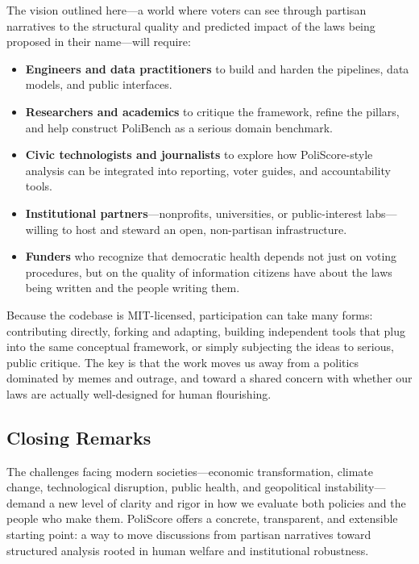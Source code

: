 \documentclass[12pt]{article}
\begin{document}
The vision outlined here---a world where voters can see through partisan narratives to the structural quality and
predicted impact of the laws being proposed in their name---will require:

\begin{itemize}
    \item \textbf{Engineers and data practitioners} to build and harden the pipelines, data models, and public interfaces.
    \item \textbf{Researchers and academics} to critique the framework, refine the pillars, and help construct PoliBench as
    a serious domain benchmark.
    \item \textbf{Civic technologists and journalists} to explore how PoliScore-style analysis can be integrated into
    reporting, voter guides, and accountability tools.
    \item \textbf{Institutional partners}---nonprofits, universities, or public-interest labs---willing to host and
    steward an open, non-partisan infrastructure.
    \item \textbf{Funders} who recognize that democratic health depends not just on voting procedures, but on the quality
    of information citizens have about the laws being written and the people writing them.
\end{itemize}

Because the codebase is MIT-licensed, participation can take many forms: contributing directly, forking and adapting,
building independent tools that plug into the same conceptual framework, or simply subjecting the ideas to serious,
public critique. The key is that the work moves us away from a politics dominated by memes and outrage, and toward a
shared concern with whether our laws are actually well-designed for human flourishing.

\subsection{Closing Remarks}

The challenges facing modern societies---economic transformation, climate change, technological disruption, public health,
and geopolitical instability---demand a new level of clarity and rigor in how we evaluate both policies and the people who
make them. PoliScore offers a concrete, transparent, and extensible starting point: a way to move discussions from partisan
narratives toward structured analysis rooted in human welfare and institutional robustness.
\end{document}
